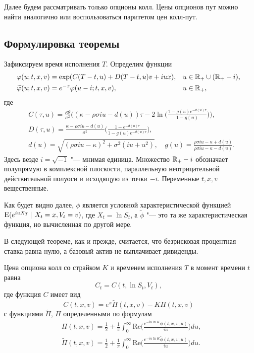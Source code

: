 Далее будем рассматривать только опционы колл.
Цены опционов пут можно найти аналогично или воспользоваться паритетом цен колл-пут.


\subsection{Формулировка теоремы}
\label{hes:s:stetement}

Зафиксируем время исполнения $T$. Определим функции
\begin{align*}
&\varphi(u;t,x,v) = \exp(C(T-t,u) + D(T-t,u)v + iu x),& &u\in\mathbb{R}_+ \cup (\mathbb{R}_+-i),\\
&\widetilde {\varphi}(u;t,x,v) = e^{-x}\varphi(u-i;t,x,v),& &u\in\mathbb{R}_+,
\end{align*}
где
\begin{align}
\label{hes:C}
&C(\tau,u) = \frac{\kappa\theta}{\sigma^2}
  \biggl(
    (\kappa- \rho\sigma iu - d(u))\tau 
    - 2\ln\biggl(\frac{1-g(u)e^{-d(u)\tau}}{1-g(u)}\biggr)
  \biggr),\\
\label{hes:D}
&D(\tau,u) = \frac{\kappa - \rho\sigma i u - d(u)}{\sigma^2}
  \biggl(\frac{1-e^{-d(u)\tau}}{1-g(u)e^{-d(u)\tau}}\biggr),\\
\label{hes:dg}
&d(u)=\sqrt{(\rho\sigma iu - \kappa)^2 + \sigma^2(iu + u^2)},\quad
  g(u) = \frac{\rho\sigma iu- \kappa +d(u)}{\rho\sigma iu - \kappa -d(u)}.
\end{align}
Здесь везде $i=\sqrt{-1}$ "--- мнимая единица. Множество $\mathbb{R}_+-i$ обозначает полупрямую в комплексной плоскости, параллельную неотрицательной действительной полуоси и исходящую из точки $-i$.
Переменные $t,x,v$ вещественные.

Как будет видно далее, $\phi$ является условной характеристической функцией $\operatorname{E} (e^{iu X_T}\mid X_t=x, V_t=v)$, где $X_t=\ln S_t$, а $\tilde \phi$ "--- это та же характеристическая функция, но вычисленная по другой мере.

В следующей теореме, как и прежде, считается, что безрисковая процентная ставка равна нулю, а базовый актив не выплачивает дивиденды.

\begin{theorem}[С.~Хестон]
\label{hes:t:formula}
Цена опциона колл со страйком $K$ и временем исполнения $T$ в момент времени $t$ равна
\begin{equation}
\label{hes:call-repr}
C_t = C(t,\ln S_t,V_t),
\end{equation}
где функция $C$ имеет вид
\begin{equation}
\label{hes:call-undiscounted}
C(t,x,v) = e^x \tilde \Pi(t,x,v) - K \Pi(t,x,v)
\end{equation}
с функциями $\tilde\Pi$, $\Pi$ определенными по формулам
\begin{align}
\label{hes:pi}
&\Pi(t,x,v) = \frac12 + \frac1\pi \int_0^\infty
  \mathrm{Re}\biggl(\frac{e^{-iu \ln K}\phi(t,x,v;u)}{iu}\biggr) du,\\[0.5em]
\label{hes:pit}
&\tilde\Pi(t,x,v) = \frac12 + \frac1\pi \int_0^\infty
  \mathrm{Re}\biggl(\frac{e^{-iu \ln K}\tilde \phi(t,x,v;u)}{iu}\biggr) du.
\end{align}
\end{theorem}

